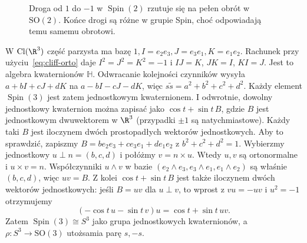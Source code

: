 \begin{figure}[!htbp]
\centering
{}
\caption{Droga od $1$ do $-1$ w $\operatorname{Spin}(2)$
rzutuje się na pełen obrót w $\mathrm{SO}(2)$.
Końce drogi są różne w grupie Spin, choć odpowiadają
temu samemu obrotowi.}
\label{fig:spin-dwukrotne}
\end{figure}

\begin{przyklad}
\label{prz:spin3}
W $\operatorname{Cl}(\R^3)$ część parzysta ma bazę
$1,I=e_2e_3,J=e_3e_1,K=e_1e_2$.
Rachunek przy użyciu~\eqref{eq:cliff-orto} daje
$I^2=J^2=K^2=-1$ i $IJ=K$, $JK=I$, $KI=J$.
Jest to algebra kwaternionów $\mathbb H$.
Odwracanie kolejności czynników wysyła
$a+bI+cJ+dK$ na $a-bI-cJ-dK$,
więc $s\widetilde s=a^2+b^2+c^2+d^2$.
Każdy element $\operatorname{Spin}(3)$
jest zatem jednostkowym kwaternionem.
I odwrotnie, dowolny jednostkowy kwaternion
można zapisać jako $\cos t+\sin t\,B$,
gdzie $B$ jest jednostkowym dwuwektorem
w $\R^3$ (przypadki $\pm1$ są natychmiastowe).
Każdy taki $B$ jest iloczynem dwóch
prostopadłych wektorów jednostkowych. Aby to sprawdzić,
zapiszmy $B=b e_2e_3+c e_3e_1+d e_1e_2$ z $b^2+c^2+d^2=1$.
Wybierzmy jednostkowy $u\perp n=(b,c,d)$ i połóżmy
$v=n\times u$. Wtedy $u,v$ są ortonormalne i $u\times v=n$.
Współczynniki $u\wedge v$ w bazie
$(e_2\wedge e_3,e_3\wedge e_1,e_1\wedge e_2)$ są właśnie $(b,c,d)$,
więc $uv=B$. Z kolei
$\cos t+\sin t\,B$ jest także iloczynem dwóch
wektorów jednostkowych: jeśli $B=uv$ dla
$u\perp v$, to wprost z $vu=-uv$ i $u^2=-1$
otrzymujemy
\[
 (-\cos t\,u-\sin t\,v)u
     =\cos t+\sin t\,uv.
\]
Zatem $\operatorname{Spin}(3)\cong S^3$
jako grupa jednostkowych kwaternionów,
a $\rho:S^3\to\mathrm{SO}(3)$ utożsamia
parę $s,-s$.
\end{przyklad}


